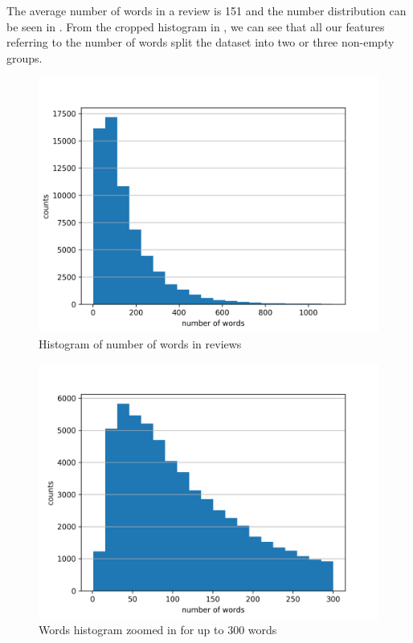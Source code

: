 The average number of words in a review is 151 and the number distribution can be seen
in .
From the cropped histogram in , we can see that all our features
referring to the number of words split the dataset into two or three non-empty groups.

\begin{figure}[ht]\centering
\includegraphics[width=130mm]{figures/word_hist.png}
\caption{Histogram of number of words in reviews}\label{fig:word_hist}
\end{figure}

\begin{figure}[ht]\centering
	\includegraphics[width=130mm]{figures/word_hist_cropped.png}
\caption{Words histogram zoomed in for up to 300 words}\label{fig:word_hist_crop}
\end{figure}



